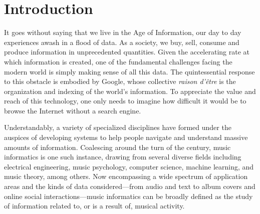 

\graphicspath{{1/figures/}}

\chapter{Introduction}
\label{chp:introduction}

It goes without saying that we live in the Age of Information, our day to day experiences awash in a flood of data.
As a society, we buy, sell, consume and produce information in unprecedented quantities.
Given the accelerating rate at which information is created, one of the fundamental challenges facing the modern world is simply making sense of all this data.
The quintessential response to this obstacle is embodied by Google, whose collective \emph{raison d'\^etre} is the organization and indexing of the world's information.
To appreciate the value and reach of this technology, one only needs to imagine how difficult it would be to browse the Internet without a search engine.




Understandably, a variety of specialized disciplines have formed under the auspices of developing systems to help people navigate and understand massive amounts of information.
Coalescing around the turn of the century, music informatics is one such instance, drawing from several diverse fields including electrical engineering, music psychology, computer science, machine learning, and music theory, among others.
Now encompassing a wide spectrum of application areas and the kinds of data considered---from audio and text to album covers and online social interactions---music informatics can be broadly defined as the study of information related to, or is a result of, musical activity.

